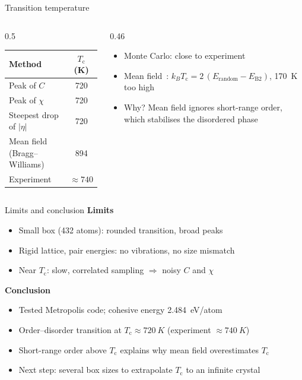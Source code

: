 \documentclass[aspectratio=169, 11pt]{beamer}
\newcommand{\Tc}{T_\mathrm{c}}
\begin{document}
\begin{frame}{Transition temperature}
  \begin{columns}[c]
    \begin{column}{0.5\textwidth}
      \centering
      \begin{tabular}{lc}
        \toprule
        Method & $\Tc$ (K) \\
        \midrule
        Peak of $C$ & 720 \\
        Peak of $\chi$ & 720 \\
        Steepest drop of $|\eta|$ & 720 \\
        \midrule
        Mean field (Bragg--Williams) & 894 \\
        Experiment & $\approx 740$ \\
        \bottomrule
      \end{tabular}
    \end{column}
    \begin{column}{0.46\textwidth}
      \begin{itemize}
        \item Monte Carlo: \alert{close to experiment}
        \item Mean field~\cite{BraggWilliams1934}: $k_B\Tc = 2\,(E_\text{random} - E_\text{B2})$, \alert{170~K too high}
        \item Why? Mean field ignores short-range order, which stabilises the disordered phase
      \end{itemize}
    \end{column}
  \end{columns}
\end{frame}

\begin{frame}{Limits and conclusion}
  \textbf{Limits}
  \begin{itemize}
    \item Small box (432 atoms): rounded transition, broad peaks
    \item Rigid lattice, pair energies: no vibrations, no size mismatch
    \item Near $\Tc$: slow, correlated sampling $\Rightarrow$ noisy $C$ and $\chi$
  \end{itemize}
  \textbf{Conclusion}
  \begin{itemize}
    \item Tested Metropolis code; cohesive energy \SI{2.484}{eV/atom}
    \item Order--disorder transition at \alert{$\Tc \approx \SI{720}{K}$} (experiment $\approx \SI{740}{K}$)
    \item Short-range order above $\Tc$ explains why mean field overestimates $\Tc$
    \item Next step: several box sizes to extrapolate $\Tc$ to an infinite crystal~\cite{LandauBinder2014}
  \end{itemize}
\end{frame}
\end{document}
